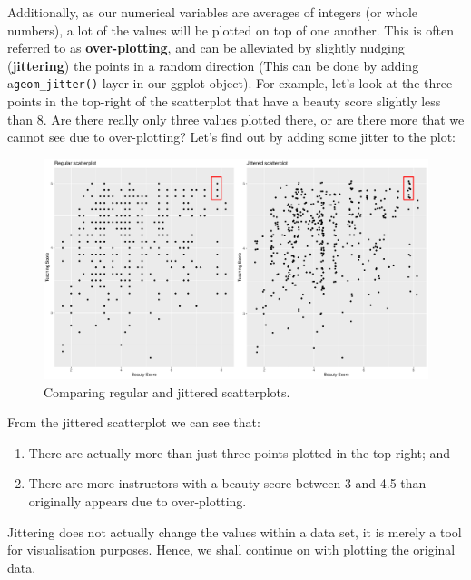 \documentclass[
  letterpaper,
  DIV=11,
  numbers=noendperiod]{scrartcl}
\providecommand{\tightlist}{%
  \setlength{\itemsep}{0pt}\setlength{\parskip}{0pt}}\usepackage{longtable,booktabs,array}
\begin{document}
Additionally, as our numerical variables are averages of integers (or
whole numbers), a lot of the values will be plotted on top of one
another. This is often referred to as \textbf{over-plotting}, and can be
alleviated by slightly nudging (\textbf{jittering}) the points in a
random direction (This can be done by adding a\texttt{geom\_jitter()}
layer in our ggplot object). For example, let's look at the three points
in the top-right of the scatterplot that have a beauty score slightly
less than 8. Are there really only three values plotted there, or are
there more that we cannot see due to over-plotting? Let's find out by
adding some jitter to the plot:

\begin{figure}[H]

{\centering \includegraphics{index_files/figure-pdf/correlation5-1.pdf}

}

\caption{Comparing regular and jittered scatterplots.}

\end{figure}%

From the jittered scatterplot we can see that:

\begin{enumerate}
\def\labelenumi{\arabic{enumi}.}
\tightlist
\item
  There are actually more than just three points plotted in the
  top-right; and
\item
  There are more instructors with a beauty score between 3 and 4.5 than
  originally appears due to over-plotting.
\end{enumerate}

\begin{tcolorbox}[enhanced jigsaw, left=2mm, coltitle=black, breakable, rightrule=.15mm, colbacktitle=quarto-callout-note-color!10!white, opacitybacktitle=0.6, bottomtitle=1mm, colback=white, toptitle=1mm, title=\textcolor{quarto-callout-note-color}{\faInfo}\hspace{0.5em}{Note}, titlerule=0mm, colframe=quarto-callout-note-color-frame, toprule=.15mm, arc=.35mm, opacityback=0, leftrule=.75mm, bottomrule=.15mm]

Jittering does not actually change the values within a data set, it is
merely a tool for visualisation purposes. Hence, we shall continue on
with plotting the original data.

\end{tcolorbox}
\end{document}
